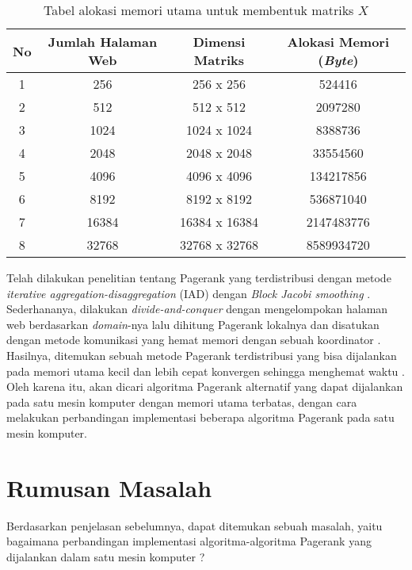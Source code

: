 \begin{table}[h!]
	\centering
	\caption{Tabel alokasi memori utama untuk membentuk matriks $X$}
	\label{table:1}
	\begin{tabular}{|c|c|c|c|} 
		\hline
		No & Jumlah Halaman Web & Dimensi Matriks & Alokasi Memori (\textit{Byte}) \\
		\hline
		
		\hline
		1 & 256 & 256 x 256 & 524416 \\
		2 & 512 & 512 x 512 & 2097280 \\
		3 & 1024 & 1024 x 1024 & 8388736 \\
		4 & 2048 & 2048 x 2048 & 33554560 \\
		5 & 4096 & 4096 x 4096 & 134217856 \\
		6 & 8192 & 8192 x 8192 & 536871040 \\
		7 & 16384 & 16384 x 16384 & 2147483776 \\
		8 & 32768 & 32768 x 32768 & 8589934720 \\
		\hline
	\end{tabular}
\end{table}

Telah dilakukan penelitian tentang Pagerank yang terdistribusi dengan metode \textit{iterative aggregation-disaggregation} (IAD) dengan \textit{Block Jacobi smoothing} \citep{zhuetal2005distributedPagerank}. Sederhananya, dilakukan \textit{divide-and-conquer} dengan mengelompokan halaman web berdasarkan \textit{domain}-nya lalu dihitung Pagerank lokalnya dan disatukan dengan metode komunikasi yang hemat memori dengan sebuah koordinator \citep{zhuetal2005distributedPagerank}. Hasilnya, ditemukan sebuah metode Pagerank terdistribusi yang bisa dijalankan pada memori utama kecil dan lebih cepat konvergen sehingga menghemat waktu \citep{zhuetal2005distributedPagerank}. Oleh karena itu, akan dicari algoritma Pagerank alternatif yang dapat dijalankan pada satu mesin komputer dengan memori utama terbatas, dengan cara melakukan perbandingan implementasi beberapa algoritma Pagerank pada satu mesin komputer.

\section{Rumusan Masalah}

Berdasarkan penjelasan sebelumnya, dapat ditemukan sebuah masalah, yaitu bagaimana perbandingan implementasi algoritma-algoritma Pagerank yang dijalankan dalam satu mesin komputer ? 

